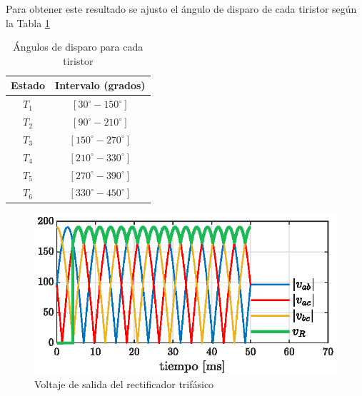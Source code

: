 \documentclass[conference]{IEEEtran}
\begin{document}


Para obtener este resultado se ajusto el ángulo de disparo de cada tiristor según la Tabla \ref{tab:angulos_disparo}

\begin{table}[h!]
	\centering
	\small
	\begin{tabular}{@{}cc@{}}
		\toprule
		Estado & Intervalo (grados) \\ \midrule
	    $T_{1}$ & $[30^\circ- 150^\circ]$ \\
		$T_{2}$ & $[90^\circ- 210^\circ]$ \\
		$T_{3}$ & $[150^\circ-270^\circ]$ \\
		$T_{4}$ & $[210^\circ-330^\circ]$ \\
		$T_{5}$ & $[270^\circ-390^\circ]$ \\
		$T_{6}$ & $[330^\circ-450^\circ]$ \\ \bottomrule
	\end{tabular}
	\caption{Ángulos de disparo para cada tiristor}
	\label{tab:angulos_disparo}
\end{table}


\begin{figure}[ht]
	\centering
	\includegraphics[scale=1]{Fig/volt_lin_R.eps}
	\caption{Voltaje de salida del rectificador trifásico}
	\label{fig:v_oi_cero}
\end{figure}
\end{document}
